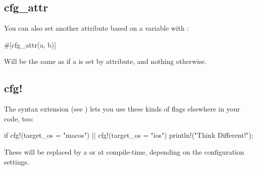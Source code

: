 \subsection*{cfg\_attr}

You can also set another attribute based on a  variable with :

\begin{rustc}
#[cfg_attr(a, b)]
\end{rustc}

Will be the same as \code{\#[b]} if a is set by  attribute, and nothing otherwise.

\subsection*{cfg!}

The  syntax extension (see ) lets you use these kinds of flags elsewhere in your code, too:

\begin{rustc}
if cfg!(target_os = "macos") || cfg!(target_os = "ios") {
    println!("Think Different!");
}
\end{rustc}

These will be replaced by a  or  at compile-time, depending on the configuration settings.
